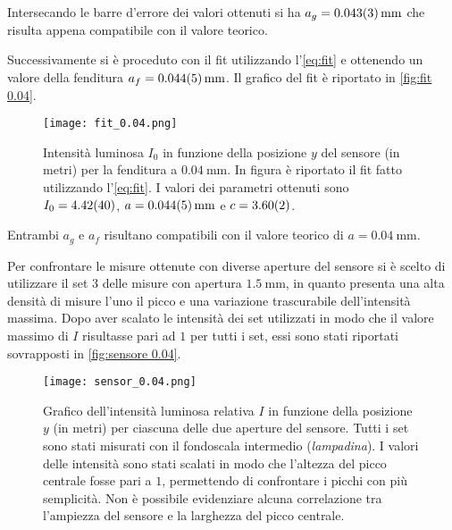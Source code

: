 \documentclass[../main.tex]{subfiles}
\begin{document}
Intersecando le barre d'errore dei valori ottenuti si ha $a_g = \qty{0.043+-0.003}{\mm}$ che risulta appena compatibile con il valore teorico.



\newpage

Successivamente si è proceduto con il fit utilizzando l'\autoref{eq:fit} e ottenendo un valore della fenditura $a_f = \qty{0.044+-0.005}{\mm}$. Il grafico del fit è riportato in \autoref{fig:fit 0.04}.

\begin{figure}[ht!]
    \centering
    \texttt{[image: fit\_0.04.png]}
    \caption{Intensità luminosa $I_{0}$ in funzione della posizione $y$ del sensore (in metri) per la fenditura a $\qty{0.04}{\mm}$. In figura è riportato il fit fatto utilizzando l'\autoref{eq:fit}. I valori dei parametri ottenuti sono $I_{0} = \num{4.42+-0.4}$, $a = \qty{0.044+-0.005}{\mm}$ e $c = \num{3.60+-0.02}$. }
    \label{fig:fit 0.04}
\end{figure}

Entrambi $a_g$ e $a_f$ risultano compatibili con il valore teorico di $a = \qty{0.04}{\mm}$.

\newpage

Per confrontare le misure ottenute con diverse aperture del sensore si è scelto di utilizzare il set $3$ delle misure con apertura $\qty{1.5}{\mm}$, in quanto presenta una alta densità di misure l'uno il picco e una variazione trascurabile dell'intensità massima. Dopo aver scalato le intensità dei set utilizzati in modo che il valore massimo di $I$ risultasse pari ad $1$ per tutti i set, essi sono stati riportati sovrapposti in \autoref{fig:sensore 0.04}.

\begin{figure}[ht!]
    \centering
    \texttt{[image: sensor\_0.04.png]}
    \caption{Grafico dell'intensità luminosa relativa $I$ in funzione della posizione $y$ (in metri) per ciascuna delle due aperture del sensore.
    Tutti i set sono stati misurati con il fondoscala intermedio (\textit{lampadina}). I valori delle intensità sono stati scalati in modo che l'altezza del picco centrale fosse pari a $1$, permettendo di confrontare i picchi con più semplicità.
    Non è possibile evidenziare alcuna correlazione tra l'ampiezza del sensore e la larghezza del picco centrale.} %
    \label{fig:sensore 0.04}
\end{figure}
\end{document}
